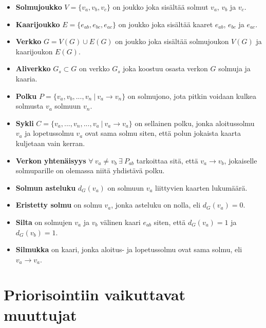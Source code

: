   \begin{itemize}
    \item \textbf{Solmujoukko} \(V = \{v_a, v_b, v_c\}\) on joukko joka sisältää solmut \(v_a\), \(v_b\) ja \(v_c\).
    \item \textbf{Kaarijoukko} \(E = \{e_{ab}, e_{bc}, e_{ac}\}\) on joukko joka sisältää kaaret \(e_{ab}\), \(e_{bc}\) ja \(e_{ac}\).
    \item \textbf{Verkko} \(G = V(G) \cup E(G)\) on joukko joka sisältää solmujoukon \(V(G)\) ja kaarijoukon \(E(G)\).
    \item \textbf{Aliverkko} \(G_s \subset G\) on verkko \(G_s\) joka koostuu osasta verkon \(G\) solmuja ja kaaria.
    \item \textbf{Polku} \(P = \{v_a, v_b, ..., v_n \: | \: v_a \rightarrow v_n\}\) on solmujono, jota pitkin voidaan kulkea solmusta \(v_a\) solmuun \(v_n\).
    \item \textbf{Sykli} \(C = \{v_a, ..., v_n,..., v_a \: | \: v_a \rightarrow v_a\}\) on sellainen polku, jonka aloitussolmu \(v_a\) ja lopetussolmu \(v_a\) ovat sama solmu siten, että polun jokaista kaarta kuljetaan vain kerran.
    \item \textbf{Verkon yhtenäisyys} \(\forall \: v_a \neq v_b \: \exists \: P_{ab}\) tarkoittaa sitä, että \(v_a \rightarrow v_b\), jokaiselle solmuparille on olemassa niitä yhdistävä polku.
    \item \textbf{Solmun asteluku} \(d_G(v_a)\) on solmuun \(v_a\) liittyvien kaarten lukumäärä.
    \item \textbf{Eristetty solmu} on solmu \(v_a\), jonka asteluku on nolla, eli \(d_G(v_a) = 0\).
    \item \textbf{Silta} on solmujen \(v_a\) ja \(v_b\) välinen kaari \(e_{ab}\) siten, että \(d_G(v_a) = 1\) ja \(d_G(v_b) = 1\).
    \item \textbf{Silmukka} on kaari, jonka aloitus- ja lopetussolmu  ovat sama solmu, eli \(v_a \rightarrow v_a\).
  \end{itemize}

\section{Priorisointiin vaikuttavat muuttujat} \label{ch:10_priorisointiin_vaikuttavat_muuttujat}

